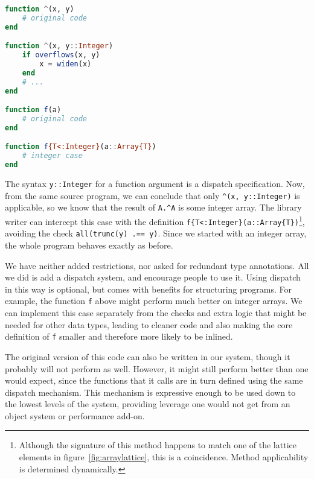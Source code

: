 \begin{singlespace}
\begin{lstlisting}[language=julia]
function ^(x, y)
    # original code
end

function ^(x, y::Integer)
    if overflows(x, y)
        x = widen(x)
    end
    # ...
end

function f(a)
    # original code
end

function f{T<:Integer}(a::Array{T})
    # integer case
end
\end{lstlisting}
\end{singlespace}

\noindent
The syntax \texttt{y::Integer} for a function argument is a dispatch specification.
Now, from the same source program, we can conclude that only
\texttt{\^{}(x, y::Integer)} is applicable, so we know that the
result of \texttt{A.\^{}A} is some integer array.
The library writer can intercept this case with the definition
\texttt{f\{T<:Integer\}(a::Array\{T\})}\footnote{
Although the signature of this method happens to match one of the
lattice elements in figure~\ref{fig:arraylattice}, this is a coincidence.
Method applicability is determined dynamically.
}, avoiding the check \texttt{all(trunc(y) .== y)}.
Since we started with an integer array, the whole program behaves
exactly as before.

We have neither added restrictions, nor asked for redundant type annotations.
All we did is add a dispatch system, and encourage people to use it.
Using dispatch in this way is optional, but comes with benefits for
structuring programs.
For example, the function \texttt{f} above might perform much better
on integer arrays.
We can implement this case separately from the checks and extra logic
that might be needed for other data types, leading to cleaner code
and also making the core definition of \texttt{f} smaller and therefore
more likely to be inlined.


The original version of this code can also be written in our system,
though it probably will not perform as well.
However, it might still perform better than one would expect, since the
functions that it calls are in turn defined using the same dispatch
mechanism.
This mechanism is expressive enough to be used down to the lowest levels of
the system, providing leverage one would not get from an object system
or performance add-on.


